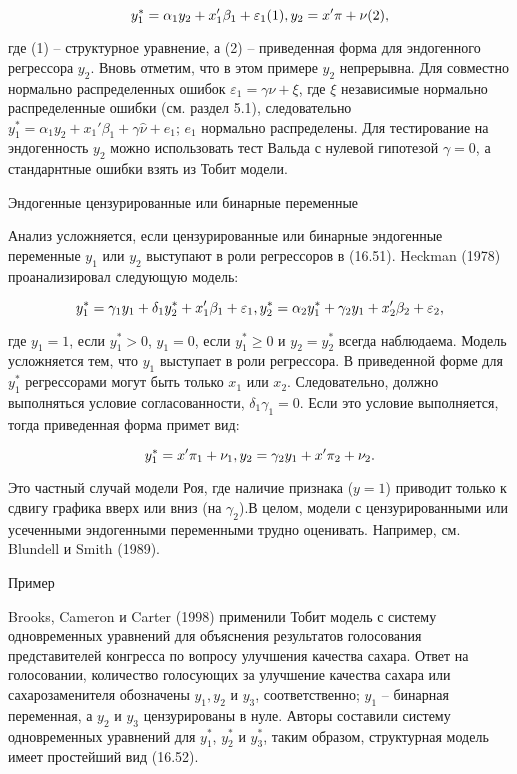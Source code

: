 \begin{equation}
y_1^{*}=\alpha_1{y_2}+x_1'\beta_1+\varepsilon_1 (1),\\
y_2=x'\pi+\nu (2),
\end{equation}

где (1) -- структурное уравнение, а (2) -- приведенная форма для эндогенного регрессора $y_2$. Вновь отметим, что в этом примере $y_2$ непрерывна. Для совместно нормально распределенных ошибок $\varepsilon_1=\gamma\nu+\xi$, где $\xi$ независимые нормально распределенные ошибки (см. раздел 5.1), следовательно $y_1^{*}=\alpha_1{y_2}+x_1'\beta_1+\gamma\hat{\nu}+e_1$; $e_1$ нормально распределены. Для тестирование на эндогенность $y_2$ можно использовать тест Вальда с нулевой гипотезой $\gamma=0$, а стандарнтные ошибки взять из Тобит модели.

Эндогенные цензурированные или бинарные переменные

Анализ усложняется, если цензурированные или бинарные эндогенные переменные $y_1$ или $y_2$ выступают в роли регрессоров в (16.51). Heckman (1978) проанализировал следующую модель:

\begin{equation}
y_1^{*}=\gamma_1{y_1}+\delta_1{y_2^{*}}+x_1'\beta_1+\varepsilon_1, \\
y_2^{*}=\alpha_2{y_1^{*}}+\gamma_2{y_1}+x_2'\beta_2+\varepsilon_2,
\end{equation}

где $y_1=1$, если $y_1^{*}>0$, $y_1=0$, если $y_1^{*}{\geq}0$ и $y_2=y_2^{*}$ всегда наблюдаема. Модель усложняется тем, что $y_1$ выступает в роли регрессора. В приведенной форме для $y_1^{*}$ регрессорами могут быть только $x_1$ или $x_2$. Следовательно, должно выполняться условие согласованности, $\delta_1\gamma_1=0$. Если это условие выполняется, тогда приведенная форма примет вид:

\[
y_1^{*}=x'\pi_1+\nu_1,\\
y_2=\gamma_2{y_1}+x'\pi_2+\nu_2.
\]

Это частный случай модели Роя, где наличие признака ($y=1$) приводит только к сдвигу графика вверх или вниз (на $\gamma_2$).В целом, модели с цензурированными или усеченными эндогенными переменными трудно оценивать. Например, см. Blundell и Smith (1989).

Пример

Brooks, Cameron и Carter (1998) применили Тобит модель с систему одновременных уравнений для объяснения результатов голосования представителей конгресса по вопросу улучшения качества сахара. Ответ на голосовании, количество голосующих за улучшение качества сахара или сахарозаменителя обозначены $y_1, y_2$ и $y_3$, соответственно; $y_1$ -- бинарная переменная, а $y_2$ и $y_3$ цензурированы в нуле. Авторы составили систему одновременных уравнений для $y_1^{*}$, $y_2^{*}$ и $y_3^{*}$, таким образом, структурная модель имеет простейший вид (16.52).

